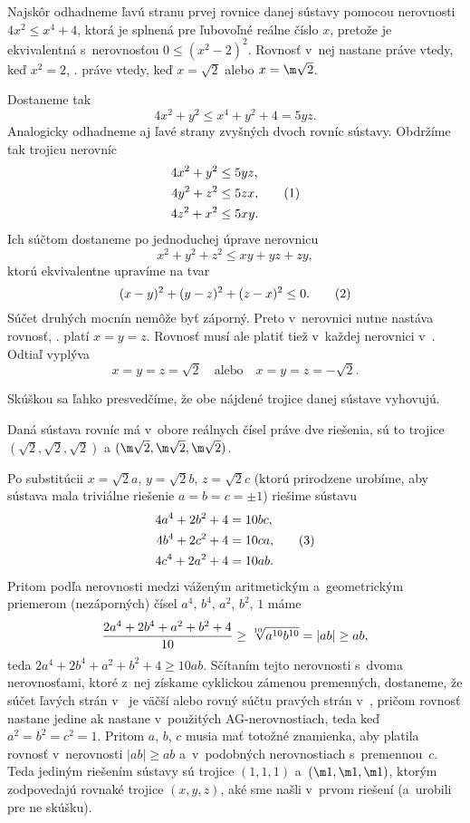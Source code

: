 {%
Najskôr odhadneme ľavú stranu prvej rovnice danej sústavy pomocou nerovnosti $4x^2\le x^4+4$, ktorá je splnená pre ľubovoľné reálne číslo $x$, pretože je ekvivalentná s~nerovnosťou $0\le(x^2-2)^2$. Rovnosť v~nej nastane práve vtedy, keď $x^2=2$, \tj. práve vtedy, keď $x=\sqrt{2}$ alebo $x=\m\sqrt{2}$.

Dostaneme tak
$$
4x^2+y^2\le x^4+y^2+4=5yz.
$$
Analogicky odhadneme aj ľavé strany zvyšných dvoch rovníc sústavy. Obdržíme tak trojicu nerovníc
$$
\aligned
 4x^2+y^2 &\le 5yz,\\
 4y^2+z^2 &\le 5zx,\\
 4z^2+x^2 &\le 5xy.
\endaligned
\tag1
$$
Ich súčtom dostaneme po jednoduchej úprave nerovnicu
$$
x^2+y^2+z^2\le xy+yz+zy,
$$
ktorú ekvivalentne upravíme na tvar
$$
(x-y)^2+(y-z)^2+(z-x)^2 \le 0.
\tag2
$$
Súčet druhých mocnín nemôže byť záporný. Preto v~nerovnici  nutne nastáva rovnosť, \tj. platí $x=y=z$. Rovnosť musí ale platiť tiež v~každej nerovnici v~. Odtiaľ vyplýva
$$
x=y=z=\sqrt{2} \quad \text{alebo} \quad x=y=z=-\sqrt{2}.
$$

Skúškou sa ľahko presvedčíme, že obe nájdené trojice danej sústave vyhovujú.

\zaver
Daná sústava rovníc má v~obore reálnych čísel práve dve riešenia, sú to trojice $(\sqrt{2},\sqrt{2},\sqrt{2})$
a $(\m\sqrt{2},\m\sqrt{2},\m\sqrt{2})$.

\ineriesenie
Po substitúcii $x=\sqrt2a$, $y=\sqrt2b$, $z=\sqrt2c$ (ktorú prirodzene urobíme, aby sústava mala triviálne riešenie $a=b=c=\pm1$) riešime sústavu
$$
\aligned
4a^4+2b^2+4&=10bc,\\
4b^4+2c^2+4&=10ca,\\
4c^4+2a^2+4&=10ab.
\endaligned
\tag3
$$
Pritom podľa nerovnosti medzi váženým aritmetickým a~geometrickým priemerom (nezáporných) čísel $a^4$, $b^4$, $a^2$, $b^2$, $1$ máme
$$
\frac{2a^4+2b^4+a^2+b^2+4}{10}\ge \root 10\of{a^{10}b^{10}}=|ab|\ge ab,
$$
teda $2a^4+2b^4+a^2+b^2+4\ge10ab$. Sčítaním tejto nerovnosti s~dvoma nerovnosťami, ktoré z~nej získame cyklickou zámenou premenných, dostaneme, že súčet ľavých strán v~ je väčší alebo rovný súčtu pravých strán v~, pričom rovnosť nastane jedine ak nastane v~použitých AG-nerovnostiach, teda keď $a^2=b^2=c^2=1$. Pritom $a$, $b$, $c$ musia mať totožné znamienka, aby platila rovnosť v~nerovnosti $|ab|\ge ab$ a~v~podobných nerovnostiach s~premennou~$c$. Teda jediným riešením sústavy  sú trojice $(1,1,1)$ a~$(\m1,\m1,\m1)$, ktorým zodpovedajú rovnaké trojice $(x,y,z)$, aké sme našli v~prvom riešení (a~urobili pre ne skúšku).
}


